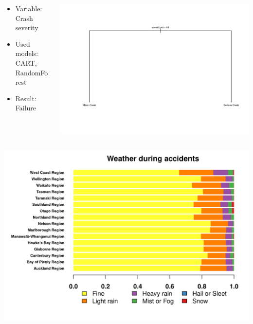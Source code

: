 \documentclass[xcolor=dvipsnames,xcolor=table, 14p]{beamer}
\begin{document}
\begin{frame}
    \begin{columns}
        \begin{column}{0.5\textwidth}
        \begin{itemize}
            \item Variable: Crash severity
            \item Used models: CART, RandomForest
            \item Result: Failure
        \end{itemize}
        \end{column}

        \begin{column}{0.5\textwidth}
            \centering
            \includegraphics[width=1\textwidth]{figures/cart-1.png}
        \end{column}
    \end{columns}
\end{frame}

\begin{frame}
    \centering
    \includegraphics[width=1\textwidth]{figures/regions3-1.png}
\end{frame}
\end{document}
